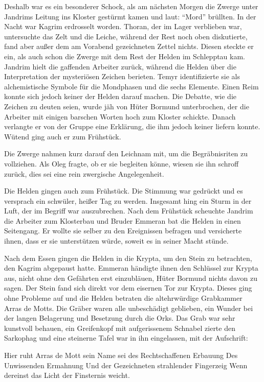 Deshalb war es ein besonderer Schock, als am nächsten Morgen die Zwerge unter Jandrims Leitung ins Kloster gestürmt kamen und laut: ``Mord'' brüllten. In der Nacht war Kagrim erdrosselt worden. Thoran, der im Lager verblieben war, untersuchte das Zelt und die Leiche, während der Rest noch oben diskutierte, fand aber außer dem am Vorabend gezeichneten Zettel nichts. Diesen steckte er ein, als auch schon die Zwerge mit dem Rest der Helden im Schlepptau kam. Jandrim hielt die gaffenden Arbeiter zurück, während die Helden über die Interpretation der mysteriösen Zeichen berieten. Temyr identifizierte sie als alchemistische Symbole für die Mondphasen und die sechs Elemente. Einen Reim konnte sich jedoch keiner der Helden darauf machen. Die Debatte, wie die Zeichen zu deuten seien, wurde jäh von Hüter Bormund unterbrochen, der die Arbeiter mit einigen barschen Worten hoch zum Kloster schickte. Danach verlangte er von der Gruppe eine Erklärung, die ihm jedoch keiner liefern konnte. Wütend ging auch er zum Frühstück.

Die Zwerge nahmen kurz darauf den Leichnam mit, um die Begräbnisriten zu vollziehen. Als Oleg fragte, ob er sie begleiten könne, wiesen sie ihn schroff zurück, dies sei eine rein zwergische Angelegenheit.

Die Helden gingen auch zum Frühstück. Die Stimmung war gedrückt und es versprach ein schwüler, heißer Tag zu werden. Insgesamt hing ein Sturm in der Luft, der im Begriff war auszubrechen. Nach dem Frühstück scheuchte Jandrim die Arbeiter zum Klosterbau und Bruder Emmeran bat die Helden in einen Seitengang. Er wollte sie selber zu den Ereignissen befragen und versicherte ihnen, dass er sie unterstützen würde, soweit es in seiner Macht stünde.

Nach dem Essen gingen die Helden in die Krypta, um den Stein zu betrachten, den Kagrim abgepaust hatte. Emmeran händigte ihnen den Schlüssel zur Krypta aus, nicht ohne den Gefährten erst einzubläuen, Hüter Bormund nichts davon zu sagen. Der Stein fand sich direkt vor dem eisernen Tor zur Krypta. Dieses ging ohne Probleme auf und die Helden betraten die altehrwürdige Grabkammer Arras de Motts. Die Gräber waren alle unbeschädigt geblieben, ein Wunder bei der langen Belagerung und Besetzung durch die Orks. Das Grab war sehr kunstvoll behauen, ein Greifenkopf mit aufgerissenem Schnabel zierte den Sarkophag und eine steinerne Tafel war in ihn eingelassen, mit der Aufschrift:


Hier ruht Arras de Mott\newline
sein Name sei des Rechtschaffenen Erbauung\newline
Des Unwissenden Ermahnung\newline
Und der Gezeichneten strahlender Fingerzeig\newline
Wenn dereinst\newline
das Licht der Finsternis weicht.


